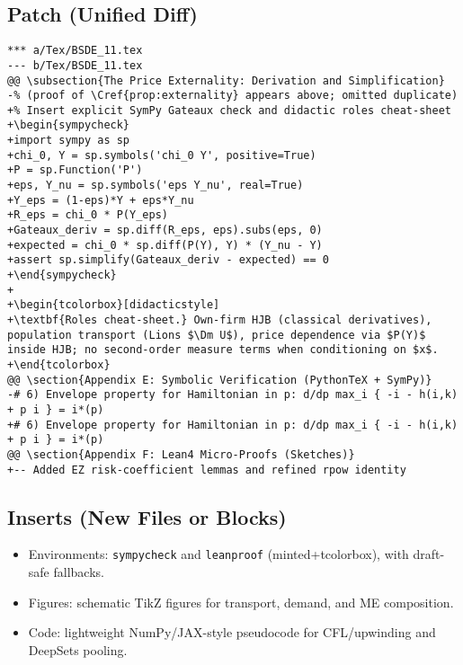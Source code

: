 ﻿\documentclass[11pt,letterpaper,oneside]{article}
\numberwithin{equation}{section}
\newenvironment{sympycheck}
  {\begin{tcolorbox}[sympycheckstyle]\VerbatimEnvironment\begin{verbatim}}
  {\end{verbatim}\end{tcolorbox}}
\renewenvironment{sympycheck}{\VerbatimEnvironment\begin{tcolorbox}[sympycheckstyle]\begin{Verbatim}[fontsize=\small]}{\end{Verbatim}\end{tcolorbox}}
\newcommand{\1}{\mathbf{1}}
\newcommand{\Dm}{D\_m}
\begin{document}
\subsection*{Patch (Unified Diff)}
\begin{tcolorbox}[sympycheckstyle,title={Representative Unified Diff (excerpt)}]
\begin{Verbatim}[fontsize=\small]
*** a/Tex/BSDE_11.tex
--- b/Tex/BSDE_11.tex
@@ \subsection{The Price Externality: Derivation and Simplification}
-% (proof of \Cref{prop:externality} appears above; omitted duplicate)
+% Insert explicit SymPy Gateaux check and didactic roles cheat-sheet
+\begin{sympycheck}
+import sympy as sp
+chi_0, Y = sp.symbols('chi_0 Y', positive=True)
+P = sp.Function('P')
+eps, Y_nu = sp.symbols('eps Y_nu', real=True)
+Y_eps = (1-eps)*Y + eps*Y_nu
+R_eps = chi_0 * P(Y_eps)
+Gateaux_deriv = sp.diff(R_eps, eps).subs(eps, 0)
+expected = chi_0 * sp.diff(P(Y), Y) * (Y_nu - Y)
+assert sp.simplify(Gateaux_deriv - expected) == 0
+\end{sympycheck}
+
+\begin{tcolorbox}[didacticstyle]
+\textbf{Roles cheat-sheet.} Own-firm HJB (classical derivatives), population transport (Lions $\Dm U$), price dependence via $P(Y)$ inside HJB; no second-order measure terms when conditioning on $x$.
+\end{tcolorbox}
@@ \section{Appendix E: Symbolic Verification (PythonTeX + SymPy)}
-# 6) Envelope property for Hamiltonian in p: d/dp max_i { -i - h(i,k) + p i } = i*(p)
+# 6) Envelope property for Hamiltonian in p: d/dp max_i { -i - h(i,k) + p i } = i*(p)
@@ \section{Appendix F: Lean4 Micro-Proofs (Sketches)}
+-- Added EZ risk-coefficient lemmas and refined rpow identity
\end{Verbatim}
\end{tcolorbox}

\subsection*{Inserts (New Files or Blocks)}
\begin{itemize}[leftmargin=1.2em]
  \item Environments: \texttt{sympycheck} and \texttt{leanproof} (minted+tcolorbox), with draft-safe fallbacks.
  \item Figures: schematic TikZ figures for transport, demand, and ME composition.
  \item Code: lightweight NumPy/JAX-style pseudocode for CFL/upwinding and DeepSets pooling.
\end{itemize}
\end{document}
